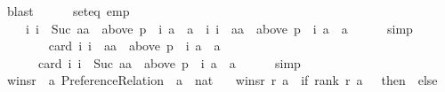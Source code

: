 \begin{isabellebody}
\ blast\isanewline
\ \ \ \ \isamarkupfalse%
\ seteq\ emp\ \isamarkupfalse%
\isanewline
\ \ \ \ {\isachardoublequoteopen}{\isacharbraceleft}{\kern0pt}i{\isachardot}{\kern0pt}\ i\ {\isacharless}{\kern0pt}\ Suc\ aa\ {\isasymand}\ above\ {\isacharparenleft}{\kern0pt}p\ {\isacharbang}{\kern0pt}\ i{\isacharparenright}{\kern0pt}\ a\ {\isacharequal}{\kern0pt}\ {\isacharbraceleft}{\kern0pt}a{\isacharbraceright}{\kern0pt}{\isacharbraceright}{\kern0pt}\ {\isacharequal}{\kern0pt}\ {\isacharbraceleft}{\kern0pt}i{\isachardot}{\kern0pt}\ i\ {\isacharless}{\kern0pt}\ aa\ {\isasymand}\ above\ {\isacharparenleft}{\kern0pt}p\ {\isacharbang}{\kern0pt}\ i{\isacharparenright}{\kern0pt}\ a\ {\isacharequal}{\kern0pt}\ {\isacharbraceleft}{\kern0pt}a{\isacharbraceright}{\kern0pt}{\isacharbraceright}{\kern0pt}{\isachardoublequoteclose}\isanewline
\ \ \ \ \isamarkupfalse%
\ simp\isanewline
\ \ \isamarkupfalse%
\ \isamarkupfalse%
\ {\isachardoublequoteopen}\isanewline
\ \ \ \ \ \ card\ {\isacharbraceleft}{\kern0pt}i{\isachardot}{\kern0pt}\ i\ {\isacharless}{\kern0pt}\ aa\ {\isasymand}\ above\ {\isacharparenleft}{\kern0pt}p\ {\isacharbang}{\kern0pt}\ i{\isacharparenright}{\kern0pt}\ a\ {\isacharequal}{\kern0pt}\ {\isacharbraceleft}{\kern0pt}a{\isacharbraceright}{\kern0pt}{\isacharbraceright}{\kern0pt}\ {\isacharequal}{\kern0pt}\isanewline
\ \ \ \ \ \ card\ {\isacharbraceleft}{\kern0pt}i{\isachardot}{\kern0pt}\ i\ {\isacharless}{\kern0pt}\ Suc\ aa\ {\isasymand}\ above\ {\isacharparenleft}{\kern0pt}p\ {\isacharbang}{\kern0pt}\ i{\isacharparenright}{\kern0pt}\ a\ {\isacharequal}{\kern0pt}\ {\isacharbraceleft}{\kern0pt}a{\isacharbraceright}{\kern0pt}{\isacharbraceright}{\kern0pt}{\isachardoublequoteclose}\isanewline
\ \ \ \ \isamarkupfalse%
\ simp\isanewline
{}\isamarkupfalse%
%
\endisatagproof
{\isafoldproof}%
%
\isadelimproof
\isanewline
%
\endisadelimproof
\isanewline
{}\isamarkupfalse%
\ winsr\ {\isacharcolon}{\kern0pt}{\isacharcolon}{\kern0pt}\ {\isachardoublequoteopen}{\isacharprime}{\kern0pt}a\ Preference{\isacharunderscore}{\kern0pt}Relation\ {\isasymRightarrow}\ {\isacharprime}{\kern0pt}a\ {\isasymRightarrow}\ nat{\isachardoublequoteclose}\ \isanewline
\ \ {\isachardoublequoteopen}winsr\ r\ a\ {\isasymequiv}\ {\isacharparenleft}{\kern0pt}if\ {\isacharparenleft}{\kern0pt}rank\ r\ a\ {\isacharequal}{\kern0pt}\ {}{\isacharparenright}{\kern0pt}\ then\ {}\ else\ {}{\isacharparenright}{\kern0pt}{\isachardoublequoteclose}\isanewline

\end{isabellebody}
